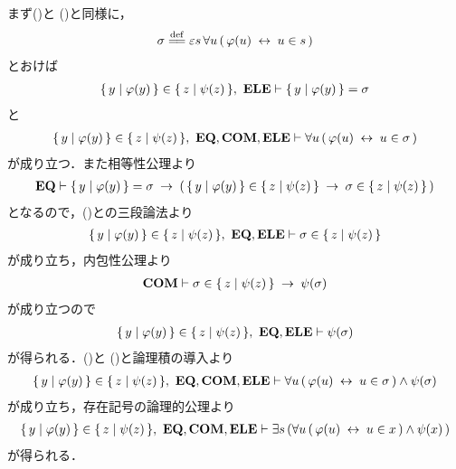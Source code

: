 	\begin{sketch}
		まず()と
		()と同様に，
		\begin{align}
			\sigma \defeq 
			\varepsilon s\, \forall u\, (\, \varphi(u) \lrarrow u \in s\, )
		\end{align}
		とおけば
		\begin{align}
			\{\, y \mid \varphi(y)\, \} \in \{\, z \mid \psi(z)\, \},\ \mbox{{\bf ELE}} \vdash 
			\{\, y \mid \varphi(y)\, \} = \sigma
			\label{fom:equivalent_formula_rewriting_11_1}
		\end{align}
		と
		\begin{align}
			\Set{y}{\varphi(y)} \in \Set{z}{\psi(z)},\ \EQAX,\COMAX,\ELEAX \vdash
			\forall u\, (\, \varphi(u) \lrarrow u \in \sigma\, )
			\label{fom:equivalent_formula_rewriting_11_2}
		\end{align}
		が成り立つ．また相等性公理より
		\begin{align}
			\mbox{{\bf EQ}} \vdash \{\, y \mid \varphi(y)\, \} = \sigma
			\hspace{0.25em}\rightarrow\hspace{0.25em} (\, \{\, y \mid \varphi(y)\, \} \in \{\, z \mid \psi(z)\, \}
			\hspace{0.25em}\rightarrow\hspace{0.25em} \sigma \in \{\, z \mid \psi(z)\, \}\, )
		\end{align}
		となるので，()との三段論法より
		\begin{align}
			\{\, y \mid \varphi(y)\, \} \in \{\, z \mid \psi(z)\, \},\ \mbox{{\bf EQ}},\mbox{{\bf ELE}} \vdash 
			\sigma \in \{\, z \mid \psi(z)\, \}
		\end{align}
		が成り立ち，内包性公理より
		\begin{align}
			\mbox{\bf COM} \vdash \sigma \in \{\, z \mid \psi(z)\, \} \hspace{0.25em}\rightarrow\hspace{0.25em} \psi(\sigma)
		\end{align}
		が成り立つので
		\begin{align}
			\{\, y \mid \varphi(y)\, \} \in \{\, z \mid \psi(z)\, \},\ \mbox{{\bf EQ}},\mbox{{\bf ELE}} \vdash 
			\psi(\sigma)
			\label{fom:equivalent_formula_rewriting_11_3}
		\end{align}
		が得られる．()と
		()と論理積の導入より
		\begin{align}
			\Set{y}{\varphi(y)} \in \Set{z}{\psi(z)},\ \EQAX,\COMAX,\ELEAX \vdash
			\forall u\, (\, \varphi(u) \lrarrow u \in \sigma\, ) \wedge \psi(\sigma)
		\end{align}
		が成り立ち，存在記号の論理的公理より
		\begin{align}
			\Set{y}{\varphi(y)} \in \Set{z}{\psi(z)},\ \EQAX,\COMAX,\ELEAX \vdash
			\exists s\, (\forall u\, (\, \varphi(u) \lrarrow u \in x\, ) \wedge \psi(x)\, )
		\end{align}
		が得られる．
		\QED
	\end{sketch}
	
